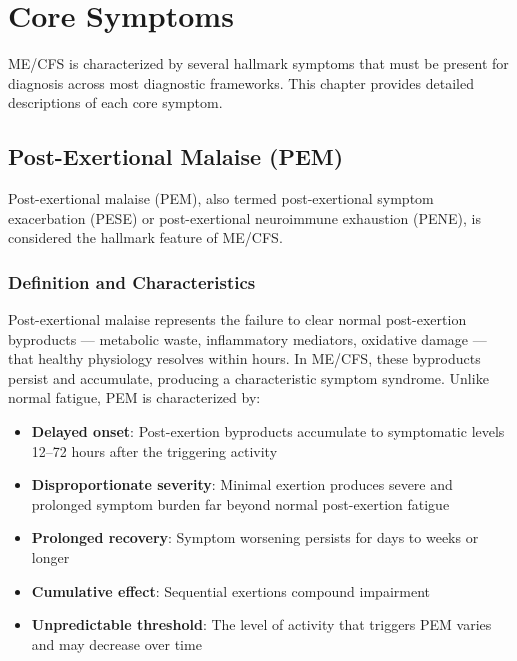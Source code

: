 \chapter{Core Symptoms}
\label{ch:core-symptoms}

ME/CFS is characterized by several hallmark symptoms that must be present for diagnosis across most diagnostic frameworks. This chapter provides detailed descriptions of each core symptom.

\section{Post-Exertional Malaise (PEM)}
\label{sec:pem}

Post-exertional malaise (PEM), also termed post-exertional symptom exacerbation (PESE) or post-exertional neuroimmune exhaustion (PENE), is considered the hallmark feature of ME/CFS.

\subsection{Definition and Characteristics}

Post-exertional malaise represents the failure to clear normal post-exertion byproducts --- metabolic waste, inflammatory mediators, oxidative damage --- that healthy physiology resolves within hours. In ME/CFS, these byproducts persist and accumulate, producing a characteristic symptom syndrome. Unlike normal fatigue, PEM is characterized by:

\begin{itemize}
    \item \textbf{Delayed onset}: Post-exertion byproducts accumulate to symptomatic levels 12--72 hours after the triggering activity
    \item \textbf{Disproportionate severity}: Minimal exertion produces severe and prolonged symptom burden far beyond normal post-exertion fatigue
    \item \textbf{Prolonged recovery}: Symptom worsening persists for days to weeks or longer
    \item \textbf{Cumulative effect}: Sequential exertions compound impairment
    \item \textbf{Unpredictable threshold}: The level of activity that triggers PEM varies and may decrease over time
\end{itemize}

